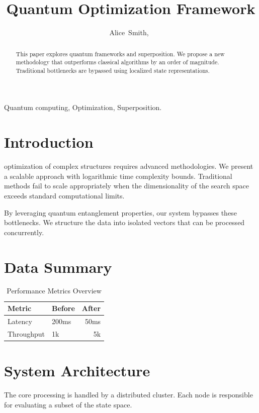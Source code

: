 \documentclass[journal]{IEEEtran}
\begin{document}
\title{Quantum Optimization Framework}
\author{Alice~Smith,~}

\maketitle

\begin{abstract}
This paper explores quantum frameworks and superposition. We propose a new methodology that outperforms classical algorithms by an order of magnitude. Traditional bottlenecks are bypassed using localized state representations.
\end{abstract}

\begin{IEEEkeywords}
Quantum computing, Optimization, Superposition.
\end{IEEEkeywords}

\section{Introduction}
 optimization of complex structures requires advanced methodologies. We present a scalable approach with logarithmic time complexity bounds. Traditional methods fail to scale appropriately when the dimensionality of the search space exceeds standard computational limits. 

By leveraging quantum entanglement properties, our system bypasses these bottlenecks. We structure the data into isolated vectors that can be processed concurrently.

\section{Data Summary}
\begin{table}[h]
\caption{Performance Metrics Overview}
\begin{center}
\begin{tabular}{llr}
\toprule
Metric & Before & After \\
\midrule
Latency & 200ms & 50ms \\
Throughput & 1k & 5k \\
\bottomrule
\end{tabular}
\end{center}
\end{table}

\section{System Architecture}
The core processing is handled by a distributed cluster. Each node is responsible for evaluating a subset of the state space. 
\end{document}
